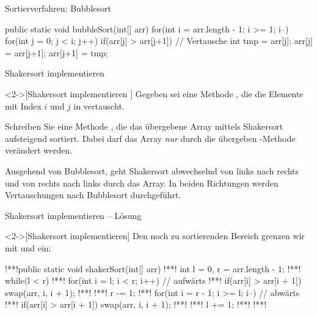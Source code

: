 \begin{frame}[fragile,c]{Sortierverfahren: Bubblesort}
    \begin{plainjava}
public static void bubbleSort(int[] arr) {
    for(int i = arr.length - 1; i >= 1; i--) {
        for(int j = 0; j < i; j++) {
            if(arr[j] > arr[j+1]) { // Vertausche
                int tmp = arr[j];
                arr[j] = arr[j+1];
                arr[j+1] = tmp;
            }
        }
    }
}
    \end{plainjava}
\end{frame}


\ifull
\begin{frame}[c]{Shakersort implementieren}
    \begin{exercise}<2->[Shakersort implementieren ]
        \pause{}Gegeben sei eine Methode , die die Elemente mit Index \(i\) und \(j\) in  vertauscht.\medskip\par\pause Schreiben Sie eine Methode , die das übergebene Array mittels Shakersort aufsteigend sortiert. Dabei darf das Array \emph{nur} durch die übergeben -Methode verändert werden.\medskip\par
        Ausgehend von Bubblesort, geht Shakersort abwechselnd von links nach rechts und von rechts nach links durch das Array. In beiden Richtungen werden Vertauschungen nach Bubblesort durchgeführt.
    \end{exercise}
\end{frame}

\begin{frame}[fragile,c]{Shakersort implementieren -- Lösung}
    \begin{solve}<2->[Shakersort implementieren]
        \pause{}Den noch zu sortierenden Bereich grenzen wir mit  und  ein:
\begin{plainjava}
!**!public static void shakerSort(int[] arr) {
!**!    int l = 0, r = arr.length - 1;
!**!    while(l < r) {
!**!        for(int i = l; i < r; i++) { // aufwärts
!**!            if(arr[i] > arr[i + 1]) swap(arr, i, i + 1);
!**!        }
!**!        r -= 1;
!**!        for(int i = r - 1; i >= l; i--) { // abwärts
!**!            if(arr[i] > arr[i + 1]) swap(arr, i, i + 1);
!**!        }
!**!        l += 1;
!**!    }
!**!}
    \end{plainjava}
    \end{solve}
\end{frame}

